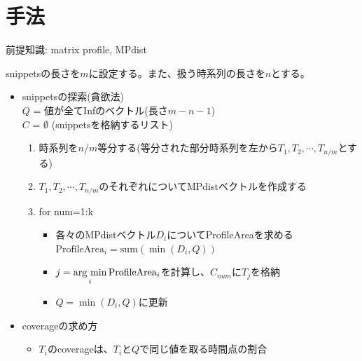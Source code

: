 \documentclass{jsarticle}
\newcommand{\argmin}{\mathop{\rm arg~min}\limits}
\begin{document}
\section{手法}
前提知識: matrix profile, MPdist\par
snippetsの長さを$m$に設定する。また、扱う時系列の長さを$n$とする。\newline
\par
\begin{itemize}
	\item snippetsの探索(貪欲法)\\
$Q$ = 値が全てInfのベクトル(長さ$m-n-1$)\\
$C$ = $\emptyset$ (snippetsを格納するリスト)
\begin{enumerate}
	\item 時系列を$n$/$m$等分する(等分された部分時系列を左から$T_1,T_2,\cdots,T_{n/m}$とする)
	\item $T_1,T_2,\cdots,T_{n/m}$のそれぞれについてMPdistベクトルを作成する
	\item for num=1:k
	\begin{itemize}
		\item 各々のMPdistベクトル$D_i$についてProfileAreaを求める \\
		$\mathrm{ProfileArea}_i = \mathrm{sum}(\min({D_i},Q)) $
		\item $j = \argmin_i \mathrm{ProfileArea}_i$を計算し、$C_{num}$に$T_j$を格納\\
		\item $Q = \min(D_i,Q)$に更新
	\end{itemize}
\end{enumerate}
\item coverageの求め方
\begin{itemize}
	\item $T_i$のcoverageは、$T_i$と$Q$で同じ値を取る時間点の割合
\end{itemize}

\end{itemize}
\end{document}

